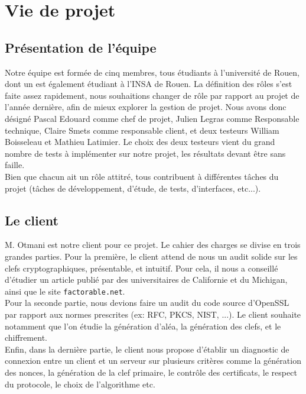 \chapter{Vie de projet}
\section{Présentation de l'équipe}

Notre équipe est formée de cinq membres, tous étudiants à l'université de Rouen, dont un est également étudiant à l'INSA de Rouen. La définition des rôles s'est faite assez rapidement, nous souhaitions changer de rôle par rapport au projet de l'année dernière, afin de mieux explorer la gestion de projet.
Nous avons donc désigné Pascal Edouard comme chef de projet, Julien Legras comme Responsable technique, Claire Smets comme responsable client, et deux testeurs William Boisseleau et Mathieu Latimier.
Le choix des deux testeurs vient du grand nombre de tests à implémenter sur notre projet, les résultats devant être sans faille.\\


Bien que chacun ait un rôle attitré, tous contribuent à différentes tâches du projet (tâches de développement, d'étude, de tests, d'interfaces, etc...).

\section{Le client}

M. Otmani est notre client pour ce projet. Le cahier des charges se divise en trois grandes parties. Pour la première, le client attend de nous un audit solide sur les clefs cryptographiques, présentable, et intuitif. Pour cela, il nous a conseillé d'étudier un article publié par des universitaires de Californie et du Michigan, ainsi que le site \texttt{factorable.net}. \\



Pour la seconde partie, nous devions faire un audit du code source d'OpenSSL par rapport aux normes prescrites (ex: RFC, PKCS, NIST, ...). Le client souhaite notamment que l'on étudie la génération d'aléa, la génération des clefs, et le chiffrement.\\

Enfin, dans la dernière partie, le client nous propose d'établir un diagnostic de connexion entre un client et un serveur sur plusieurs critères comme la génération des nonces, la génération de la clef primaire, le contrôle des certificats, le respect du protocole, le choix de l'algorithme etc.\\

